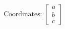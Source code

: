 \documentclass[preview]{standalone}
\begin{document}
\begin{align*}
\text{Coordinates: } \begin{bmatrix} a \\ b \\ c \end{bmatrix}
\end{align*}
\end{document}
